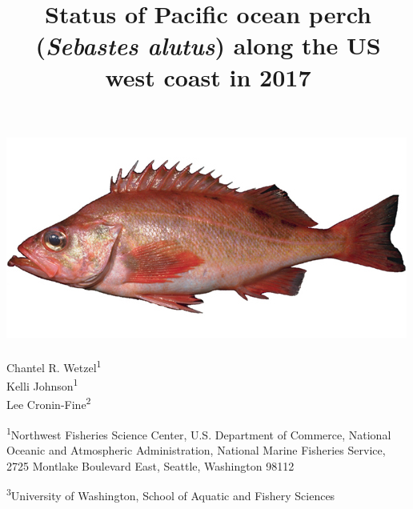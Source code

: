 \documentclass[12pt,]{article}
\title{Status of Pacific ocean perch (\emph{Sebastes alutus}) along the US west
coast in 2017}
\author{}
\date{}
\begin{document}
\maketitle


\begin{center}
\thispagestyle{empty}


\vspace{.5cm}

\includegraphics{Sebastes_alutus}~\\[0.5cm]



Chantel R. Wetzel\textsuperscript{1}\\
Kelli Johnson\textsuperscript{1}\\
Lee Cronin-Fine\textsuperscript{2}\\

\vspace{.5cm}

\small
\textsuperscript{1}Northwest Fisheries Science Center, U.S. Department of Commerce, National Oceanic and Atmospheric Administration, National Marine Fisheries Service, 2725 Montlake Boulevard East, Seattle, Washington 98112\\

\vspace{.3cm}

\textsuperscript{3}University of Washington, School of Aquatic and Fishery Sciences\\

\vspace{.3cm}



\vspace{.5cm}


\end{center}
\end{document}
